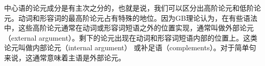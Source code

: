 中心语的论元成分是有主次之分的，也就是说，我们可以区分出高阶论元和低阶论元。动词和形容词的最高阶论元占有特殊的地位。因为GB理论认为，在有些语法中，这些高阶论元通常在动词或形容词短语之外的位置实现，通常叫做外部论元（external argument）。剩下的论元出现在动词和形容词短语内部的位置上。这类论元叫做内部论元（internal argument） 或补足语（complements）。对于简单句来说，这通常意味着主语是外部论元。

